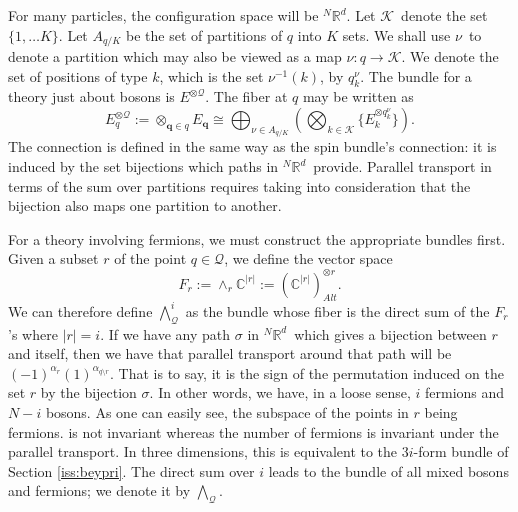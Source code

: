 \documentclass[11pt]{article}
\theoremstyle{remark}
\begin{document}
For many particles, the configuration space will be \ensuremath{{}^N\ensuremath{\mathbb{R}^{\ensuremath{d}}}}. Let \ensuremath{\mathcal{K}}\
denote the set $\{1, \ldots K\}$. 
Let $\ensuremath{A_{q/K}}$ be the set of partitions of $\ensuremath{q}$ into $K$ 
sets. We shall use \ensuremath{\nu}\ to denote a partition which may also be
viewed as a map $\ensuremath{\nu} : \ensuremath{q} \to \ensuremath{\mathcal{K}}$.  
We denote the set of positions of type $k$, which is the set $\nu^{-1}
(k)$,
 by $\ensuremath{\ensuremath{q}_k^{\nu}}$. 
The bundle
for a theory just about bosons is $E^{\otimes \ensuremath{\mathcal{Q}}}$. The fiber at
$\ensuremath{q}$ may be written as 
\[
E^{\otimes \ensuremath{\mathcal{Q}}}_{\ensuremath{q}} \ensuremath{:=} \otimes_{\ensuremath{\boldsymbol{q}} \in \ensuremath{q}}
E_{\ensuremath{\boldsymbol{q}}} \ensuremath{\cong} \bigoplus_{\ensuremath{\nu} \in \ensuremath{A_{q/K}}} (\bigotimes_{k \in \ensuremath{\mathcal{K}}}
\{E_k^{\otimes 
\ensuremath{\ensuremath{q}_k^{\nu}}}\}).\]   
The
connection is defined in
the same way as the spin bundle's connection: it
is induced by the set bijections which 
paths in \ensuremath{{}^N\ensuremath{\mathbb{R}^{\ensuremath{d}}}}\ provide. Parallel transport in terms of the 
 sum over partitions requires taking into consideration that 
 the bijection also maps one partition to another. 

For a theory involving fermions, we must construct
the appropriate bundles first. 
Given a  subset $r$ of the point $\ensuremath{q} \in \ensuremath{\mathcal{Q}}$, we
define the vector space 
\[
F_r \ensuremath{:=} \mathop{\wedge}_{r} \ensuremath{\mathbb{C}}^{\ensuremath{\lvert {r} \rvert}} \ensuremath{:=}
(\ensuremath{\mathbb{C}}^{\ensuremath{\lvert {r} \rvert}})^{\otimes r}_{Alt}.\] We can therefore define
$\bigwedge^i_{\ensuremath{\mathcal{Q}}}$ 
as the bundle whose fiber is the direct sum of the $F_r$'s
where $\ensuremath{\lvert {r} \rvert} =i$. If we have any path $\sigma$ in \ensuremath{{}^N\ensuremath{\mathbb{R}^{\ensuremath{d}}}}\ which gives a
bijection between $r$ and itself, then we have that parallel transport
around that path will be $(-1)^{{\alpha_r}}
(1)^{{\alpha_{\ensuremath{q} \setminus r}}}$. That is to say, it is the
sign of the permutation induced on the set $r$ by the bijection
$\sigma$. In other words, we have, in a loose sense,  $i$
fermions and $N-i$ bosons. As one can easily see, the subspace 
of the points in $r$ being fermions. 
is not invariant whereas the number of fermions is invariant under
the parallel transport. 
In three dimensions, this is equivalent to the $3i$-form bundle of
Section {\ref{iss:beypri}}.  The
direct sum over $i$ leads to the bundle of all mixed bosons and
fermions; we denote it by $\bigwedge_{\ensuremath{\mathcal{Q}}}$. 
\end{document}
